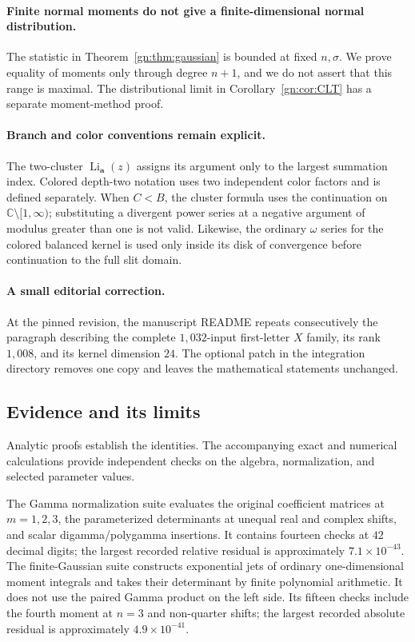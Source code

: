 \documentclass[11pt,a4paper]{article}
\numberwithin{equation}{section}
\theoremstyle{definition}
\theoremstyle{remark}
\DeclareMathOperator{\Li}{Li}
\newcommand{\C}{\mathbb C}
\begin{document}
\paragraph{Finite normal moments do not give a finite-dimensional
normal distribution.}
The statistic in Theorem~\ref{gn:thm:gaussian} is bounded at fixed
$n,\sigma$. We prove equality of moments only through degree
$n+1$, and we do not assert that this range is maximal.
The distributional limit in Corollary~\ref{gn:cor:CLT} has a
separate moment-method proof.

\paragraph{Branch and color conventions remain explicit.}
The two-cluster $\Li_{\boldsymbol a}(z)$ assigns its argument only
to the largest summation index. Colored depth-two notation uses
two independent color factors and is defined separately.
When $C<B$, the cluster formula uses the continuation on
$\C\setminus[1,\infty)$; substituting a divergent power series
at a negative argument of modulus greater than one is not valid.
Likewise, the ordinary $\omega$ series for the colored balanced
kernel is used only inside its disk of convergence before
continuation to the full slit domain.

\paragraph{A small editorial correction.}
At the pinned revision, the manuscript README repeats consecutively
the paragraph describing the complete $1{,}032$-input first-letter
$X$ family, its rank $1{,}008$, and its kernel dimension $24$.
The optional patch in the integration directory removes one
copy and leaves the mathematical statements unchanged.

\subsection{Evidence and its limits}

Analytic proofs establish the identities. The accompanying exact
and numerical calculations provide independent checks on the
algebra, normalization, and selected parameter values.

The Gamma normalization suite evaluates the original coefficient
matrices at $m=1,2,3$, the parameterized determinants at unequal
real and complex shifts, and scalar digamma/polygamma insertions.
It contains fourteen checks at $42$ decimal digits; the largest
recorded relative residual is approximately $7.1\times10^{-43}$.
The finite-Gaussian suite constructs exponential jets of ordinary
one-dimensional moment integrals and takes their determinant by
finite polynomial arithmetic. It does not use the paired Gamma
product on the left side. Its fifteen checks include the fourth
moment at $n=3$ and non-quarter shifts; the largest recorded
absolute residual is approximately $4.9\times10^{-41}$.
\end{document}
